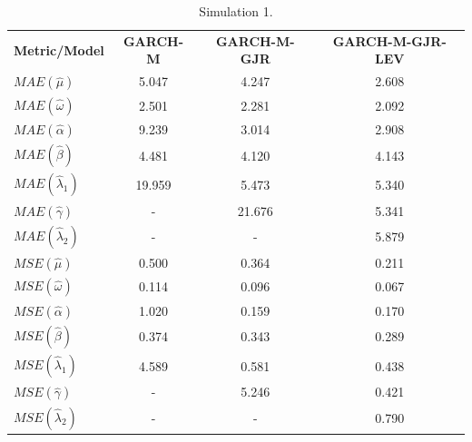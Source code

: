 \documentclass[authoryear, 1p]{elsarticle}
\numberwithin{equation}{section}
\begin{document}
\begin{table}[h!]
\centering
\caption{Simulation 1.}
\label{tab:ap_5}
\begin{tabular}{lccc}
\hline
\hline
\textbf{Metric/Model}    & \textbf{GARCH-M} & \textbf{GARCH-M-GJR} & \textbf{GARCH-M-GJR-LEV} \\
$MAE(\hat{\mu})$           & 5.047                             & 4.247                                  & 2.608                                       \\
$MAE(\hat{\omega})$        & 2.501                             & 2.281                                  & 2.092                                       \\
$MAE(\hat{\alpha})$        & 9.239                             & 3.014                                  & 2.908                                       \\
$MAE(\hat{\beta})$         & 4.481                             & 4.120                                  & 4.143                                       \\
$MAE(\hat{\lambda}_1)$       & 19.959                            & 5.473                                  & 5.340                                       \\
$MAE(\hat{\gamma})$        & -                                 & 21.676                                 & 5.341                                       \\
$MAE(\hat{\lambda}_2)$    & -                                 & -                                      & 5.879                                       \\

\hline

$MSE(\hat{\mu})$           & 0.500                             & 0.364                                  & 0.211                                       \\
$MSE(\hat{\omega})$        & 0.114                             & 0.096                                  & 0.067                                       \\
$MSE(\hat{\alpha})$        & 1.020                             & 0.159                                  & 0.170                                       \\
$MSE(\hat{\beta})$         & 0.374                             & 0.343                                  & 0.289                                       \\
$MSE(\hat{\lambda}_1)$       & 4.589                             & 0.581                                  & 0.438                                       \\
$MSE(\hat{\gamma})$        & -                                 & 5.246                                  & 0.421                                       \\
$MSE(\hat{\lambda}_2)$    & -                                 & -                                     & 0.790    \\

\hline
\hline                                  
\end{tabular}
\end{table}
\end{document}
